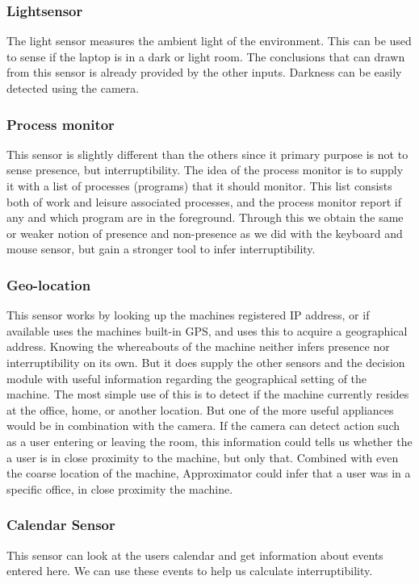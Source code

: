 \documentclass{sigchi}
\begin{document}
\subsubsection{Lightsensor}
The light sensor measures the ambient light of the environment.
This can be used to sense if the laptop is in a dark or light room.
The conclusions that can drawn from this sensor is already provided by the other inputs.
Darkness can be easily detected using the camera.

\subsubsection{Process monitor}
This sensor is slightly different than the others since it primary purpose is not to sense presence, but interruptibility.
The idea of the process monitor is to supply it with a list of processes (programs) that it should monitor.
This list consists both of work and leisure associated processes, and the process monitor report if any and which program are in the foreground. %
Through this we obtain the same or weaker notion of presence and non-presence as we did with the keyboard and mouse sensor, but gain a stronger tool to infer interruptibility.

\subsubsection{Geo-location}
This sensor works by looking up the machines registered IP address, or if available uses the machines built-in GPS, and uses this to acquire a geographical address.
Knowing the whereabouts of the machine neither infers presence nor interruptibility on its own.
But it does supply the other sensors and the decision module with useful information regarding the geographical setting of the machine.
The most simple use of this is to detect if the machine currently resides at the office, home, or another location.
But one of the more useful appliances would be in combination with the camera.
If the camera can detect action such as a user entering or leaving the room, this information could tells us whether the a user is in close proximity to the machine, but only that.
Combined with even the coarse location of the machine, Approximator could infer that a user was in a specific office, in close proximity the machine.

\subsubsection{Calendar Sensor}
This sensor can look at the users calendar and get information about events entered here.
We can use these events to help us calculate interruptibility.
\end{document}
